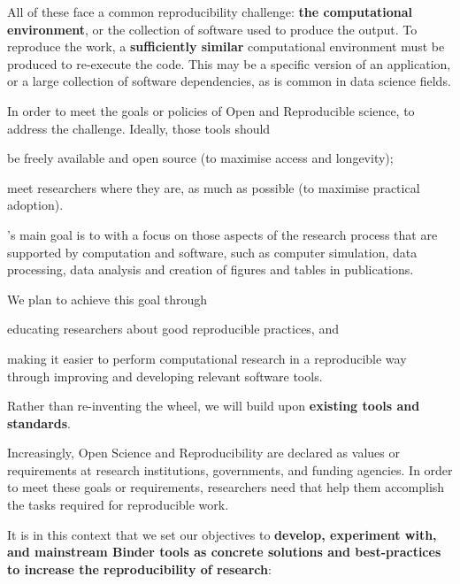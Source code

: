 All of these face a common reproducibility challenge: \textbf{the computational environment},
or the collection of software used to produce the output.
To reproduce the work, a \textbf{sufficiently similar} computational environment must be produced to re-execute the code.
This may be a specific version of an application, or a large collection of software dependencies,
as is common in data science fields.

In order to meet the goals or policies of Open and Reproducible science,
 to address the challenge. Ideally, those tools should
\begin{compactenum}
\item be freely available and open source (to maximise access and longevity);
\item meet researchers where they are, as much as possible (to maximise practical adoption).
\end{compactenum}

\TheProject's main goal is to  with a focus on those aspects of the research process that
are supported by computation and software, such as computer simulation, data
processing, data analysis and creation of figures and tables in publications.

We plan to achieve this goal through
\begin{compactitem}
\item educating researchers about good reproducible practices, and
\item making it easier to perform computational research in a reproducible way
  through improving and developing relevant software tools.
\end{compactitem}

Rather than re-inventing the wheel, we will build upon \textbf{existing tools and standards}.

Increasingly, Open Science and Reproducibility are declared as values or requirements
at research institutions, governments, and funding agencies.
In order to meet these goals or requirements,
researchers need  that help them accomplish the tasks required for reproducible work.

\clearpage
It is in this context that we set our objectives to \textbf{develop, experiment with, and mainstream Binder tools as concrete solutions and best-practices to increase the reproducibility of research}:

